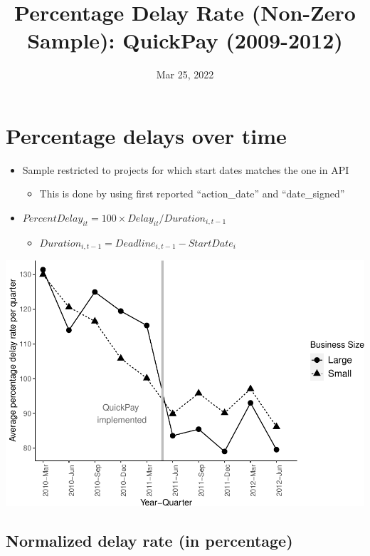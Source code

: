 \documentclass[
]{article}
\title{Percentage Delay Rate (Non-Zero Sample): QuickPay (2009-2012)}
\author{}
\date{\vspace{-2.5em}Mar 25, 2022}
\providecommand{\tightlist}{%
  \setlength{\itemsep}{0pt}\setlength{\parskip}{0pt}}
\begin{document}
\maketitle

\hypertarget{percentage-delays-over-time}{%
\section{Percentage delays over
time}\label{percentage-delays-over-time}}

\begin{itemize}
\tightlist
\item
  Sample restricted to projects for which start dates matches the one in
  API

  \begin{itemize}
  \tightlist
  \item
    This is done by using first reported ``action\_date'' and
    ``date\_signed''
  \end{itemize}
\item
  \(PercentDelay_{it}=100 \times Delay_{it}/Duration_{i,t-1}\)

  \begin{itemize}
  \tightlist
  \item
    \(Duration_{i,t-1} = Deadline_{i,t-1} - StartDate_i\)
  \end{itemize}
\end{itemize}

\includegraphics{qp_first_pc_delay_non_zero_files/figure-latex/plot_pc_delay-1.pdf}

\hypertarget{normalized-delay-rate-in-percentage}{%
\subsection{Normalized delay rate (in
percentage)}\label{normalized-delay-rate-in-percentage}}
\end{document}
